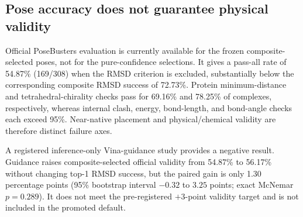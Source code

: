 \subsection{Pose accuracy does not guarantee physical validity}

Official PoseBusters evaluation is currently available for the frozen
composite-selected poses, not for the pure-confidence selections. It gives a
pass-all rate of 54.87\% (169/308) when the RMSD criterion is excluded,
substantially below the corresponding composite RMSD success of 72.73\%.
Protein minimum-distance and tetrahedral-chirality checks pass for 69.16\% and
78.25\% of complexes, respectively, whereas internal clash, energy,
bond-length, and bond-angle checks each exceed 95\%. Near-native placement and
physical/chemical validity are therefore distinct failure axes.

A registered inference-only Vina-guidance study provides a negative result.
Guidance raises composite-selected official validity from 54.87\% to 56.17\%
without changing top-1 RMSD success, but the paired gain is only 1.30
percentage points (95\% bootstrap interval \(-0.32\) to \(3.25\) points;
exact McNemar \(p=0.289\)). It does not meet the pre-registered \(+3\)-point
validity target and is not included in the promoted default.
